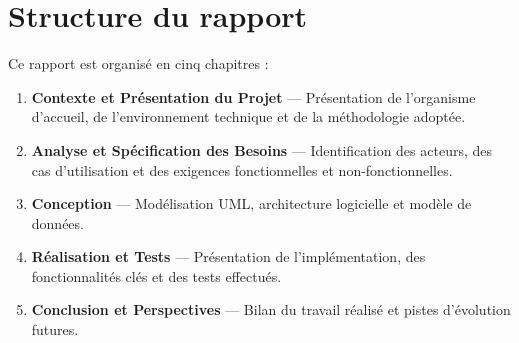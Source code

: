 \section*{Structure du rapport}

Ce rapport est organisé en cinq chapitres :

\begin{enumerate}[leftmargin=*, label=\textcolor{emsiRed}{\textbf{Chapitre \arabic*.}}]
  \item \textbf{Contexte et Présentation du Projet} --- Présentation de l'organisme d'accueil,
    de l'environnement technique et de la méthodologie adoptée.
  \item \textbf{Analyse et Spécification des Besoins} --- Identification des acteurs,
    des cas d'utilisation et des exigences fonctionnelles et non-fonctionnelles.
  \item \textbf{Conception} --- Modélisation UML, architecture logicielle et modèle de données.
  \item \textbf{Réalisation et Tests} --- Présentation de l'implémentation, des fonctionnalités
    clés et des tests effectués.
  \item \textbf{Conclusion et Perspectives} --- Bilan du travail réalisé et pistes d'évolution futures.
\end{enumerate}
